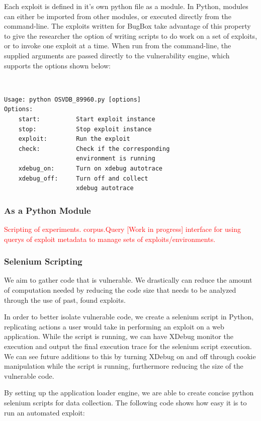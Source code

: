 \documentclass[letterpaper,twocolumn,10pt]{article}
\begin{document}
Each exploit is defined in it's own python file as a module. In Python, modules can either be imported from other modules, or executed directly from the command-line. The exploits written for BugBox take advantage of this property to give the researcher the option of writing scripts to do work on a set of exploits, or to invoke one exploit at a time. When run from the command-line, the supplied arguments are passed directly to the vulnerability engine, which supports the options shown below: 

{\tt \small
\begin{verbatim}
Usage: python OSVDB_89960.py [options]
Options:
    start:          Start exploit instance
    stop:           Stop exploit instance
    exploit:        Run the exploit
    check:          Check if the corresponding 
                    environment is running
    xdebug_on:      Turn on xdebug autotrace
    xdebug_off:     Turn off and collect 
                    xdebug autotrace
\end{verbatim}
}

\subsubsection{As a Python Module}
\textcolor{red}{
Scripting of experiments. corpus.Query [Work in progress] interface for using querys of exploit metadata to manage sets of exploits/environments. 
}


\subsubsection{Selenium Scripting}

We aim to gather code that is vulnerable.  We drastically can reduce the amount of computation needed by reducing the code size that needs to be analyzed through the use of past, found exploits.  

In order to better isolate vulnerable code, we create a selenium script in Python, replicating actions a user would take in performing an exploit on a web application.  While the script is running, we can have XDebug monitor the execution and output the final execution trace for the selenium script execution.  We can see future additions to this by turning XDebug on and off through cookie manipulation while the script is running, furthermore reducing the size of the vulnerable code.

By setting up the application loader engine, we are able to create concise python selenium scripts for data collection.  The following code shows how easy it is to run an automated exploit:
\end{document}
